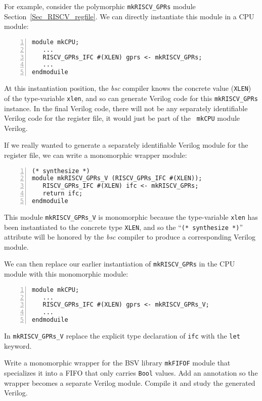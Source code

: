 For example, consider the polymorphic {\tt mkRISCV\_GPRs} module
Section~\ref{Sec_RISCV_regfile}.  We can directly instantiate this
module in a CPU module:

{\small
\begin{Verbatim}[frame=single, numbers=left]
module mkCPU;
   ...
   RISCV_GPRs_IFC #(XLEN) gprs <- mkRISCV_GPRs;
   ...
endmoduile
\end{Verbatim}
}

At this instantiation position, the \emph{bsc} compiler knows the
concrete value ({\tt XLEN}) of the type-variable {\tt xlen}, and so
can generate Verilog code for this {\tt mkRISCV\_GPRs} instance.  In
the final Verilog code, there will not be any separately identifiable
Verilog code for the register file, it would just be part of the {\tt
mkCPU} module Verilog.

If we really wanted to generate a separately identifiable Verilog
module for the register file, we can write a monomorphic wrapper
module:

{\small
\begin{Verbatim}[frame=single, numbers=left]
(* synthesize *)
module mkRISCV_GPRs_V (RISCV_GPRs_IFC #(XLEN));
   RISCV_GPRs_IFC #(XLEN) ifc <- mkRISCV_GPRs;
   return ifc;
endmoduile
\end{Verbatim}
}

This module {\tt mkRISCV\_GPRs\_V} is monomorphic because the
type-variable {\tt xlen} has been instantiated to the concrete type
{\tt XLEN}, and so the ``{\tt (* synthesize *)}'' attribute will be
honored by the \emph{bsc} compiler to produce a corresponding Verilog
module.

We can then replace our earlier instantiation of {\tt mkRISCV\_GPRs}
in the CPU module with this monomorphic module:

{\small
\begin{Verbatim}[frame=single, numbers=left]
module mkCPU;
   ...
   RISCV_GPRs_IFC #(XLEN) gprs <- mkRISCV_GPRs_V;
   ...
endmoduile
\end{Verbatim}
}

\hdivider

\Exercise

\hm In {\tt mkRISCV\_GPRs\_V} replace the explicit type declaration
of {\tt ifc} with the {\tt let} keyword.

\Exercise

\hm Write a monomorphic wrapper for the BSV library {\tt mkFIFOF}
module that specializes it into a FIFO that only carries {\tt Bool}
values.  Add an annotation so the wrapper becomes a separate Verilog
module.  Compile it and study the generated Verilog.

